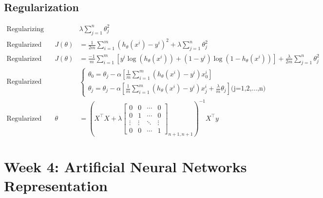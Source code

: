 \documentclass[11pt, oneside]{article}
\begin{document}
\subsection{Regularization}
	\begin{align*}
		\text{Regularizing Term} &&
			& \lambda \sum_{j=1}^n \theta_j^2\\
		\text{Regularized Linear Regression CF} &&
			J(\theta) &= \frac{1}{2 m} \sum_{i=1}^m (h_\theta(x^i) - y^i)^2 + \lambda \sum_{j=1}^n \theta_j^2\\
		\text{Regularized Logistic Regression CF} &&
			J(\theta) &= \frac{-1}{m} \sum^m_{i=1} \left[y^i\log(h_\theta(x^i)) + (1-y^i)\log(1 - h_\theta(x^i))\right] + \frac{\lambda}{2m} \sum_{j=1}^n \theta_j^2\\
		\text{Regularized GD (Lin/Log Regression)} &&
			& \begin{cases} 
				\theta_0 = \theta_j - \alpha \left[\frac{1}{m}\sum_{i=1}^m (h_\theta(x^i) - y^i)x_0^i\right]\\
				\theta_j = \theta_j - \alpha \left[\frac{1}{m}\sum_{i=1}^m (h_\theta(x^i) - y^i)x_j^i + \frac{\lambda}{m}\theta_j\right] \text{(j=1,2,...,n)}
			\end{cases}\\
		\text{Regularized Normal Equation} &&
			\theta &= (X^\intercal X + \lambda 
			\begin{bmatrix} 
				0 & 0 & \cdots & 0 \\
  				0 & 1 & \cdots & 0 \\
				\vdots  & \vdots  & \ddots & \vdots  \\
				0 & 0 & \cdots & 1 
			\end{bmatrix}_{n+1,n+1}
			)^{-1} X^\intercal y
	\end{align*}

\newpage



\section{Week 4: Artificial Neural Networks Representation}
\end{document}
